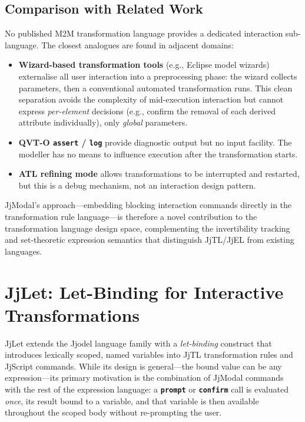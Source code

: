 \documentclass[11pt,a4paper]{article}
\newcommand{\jjmodal}{\textsf{JjModal}}
\newcommand{\jjlet}{\textsf{JjLet}}
\newcommand{\jjel}{\textsf{JjEL}}
\newcommand{\jjtl}{\textsf{JjTL}}
\newcommand{\kw}[1]{\texttt{\textbf{#1}}}
\begin{document}
\subsection{Comparison with Related Work}
 
No published M2M transformation language provides a dedicated
interaction sub-language. The closest analogues are found in adjacent
domains:
 
\begin{itemize}
    \item \textbf{Wizard-based transformation tools} (e.g., Eclipse
          model wizards) externalise all user interaction into a
          preprocessing phase: the wizard collects parameters, then a
          conventional automated transformation runs. This clean
          separation avoids the complexity of mid-execution interaction
          but cannot express \emph{per-element} decisions (e.g., confirm
          the removal of each derived attribute individually), only
          \emph{global} parameters.
    \item \textbf{QVT-O \texttt{assert} / \texttt{log}} provide
          diagnostic output but no input facility. The modeller has
          no means to influence execution after the transformation starts.
    \item \textbf{ATL refining mode} allows transformations to be
          interrupted and restarted, but this is a debug mechanism, not
          an interaction design pattern.
\end{itemize}
 
\jjmodal{}'s approach---embedding blocking interaction commands directly
in the transformation rule language---is therefore a novel contribution
to the transformation language design space, complementing the
invertibility tracking and set-theoretic expression semantics that
distinguish \jjtl{}/\jjel{} from existing languages.

\section{JjLet: Let-Binding for Interactive Transformations}\label{sec:jjlet}

\jjlet{} extends the Jjodel language family with a \emph{let-binding}
construct that introduces lexically scoped, named variables into \jjtl{}
transformation rules and \textsf{JjScript} commands. While its design is
general---the bound value can be any expression---its primary motivation
is the combination of \jjmodal{} commands with the rest of the expression
language: a \kw{prompt} or \kw{confirm} call is evaluated \emph{once},
its result bound to a variable, and that variable is then available
throughout the scoped body without re-prompting the user.
\end{document}

